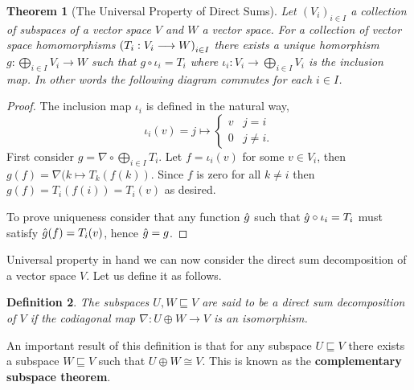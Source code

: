\documentclass[12pt]{extarticle}
\newtheorem{theorem}{Theorem}[section]
\newtheorem{definition}[theorem]{Definition}
\renewcommand{\mapsto}[0]{\longmapsto}
\renewcommand{\to}[0]{\longrightarrow}
\begin{document}
\begin{theorem}[The Universal Property of Direct Sums]
    Let $(V_i)_{i \in I}$ a collection of subspaces of a vector space $V$ and $W$ a vector space. For a collection of vector space homomorphisms $\qty(T_i : V_i \to W)_{i \in I}$ there exists a unique homorphism $g : \bigoplus_{i \in I} V_i \to W$ such that $g \circ \iota_i = T_i$ where $\iota_i : V_i \to \bigoplus_{i \in I} V_i$ is the inclusion map. In other words the following diagram commutes for each $i \in I$.
    

  \begin{center}
  \end{center}
\end{theorem}

\begin{proof}
  The inclusion map $\iota_i$ is defined in the natural way, 
  \[
    \iota_i(v) = j \mapsto \begin{cases}
      v & j = i \\
      0 & j \neq i.
    \end{cases}
  \]
  First consider $g = \nabla \circ \bigoplus_{i \in I} T_i$. Let $f  = \iota_i(v)$ for some $v \in V_i$, then $g(f) = \nabla(k \mapsto T_k(f(k))$. Since $f$ is zero for all $k \neq i$ then $g(f) = T_i(f(i)) = T_i(v)$ as desired.
  
  To prove uniqueness consider that any function $\Hat{g}$ such that $\Hat{g} \circ \iota_i = T_i$ must satisfy $\Hat{g}(f) = T_i(v)$, hence $\Hat{g} = g$. 
\end{proof}

Universal property in hand we can now consider the direct sum decomposition of a vector space $V$. Let us define it as follows. 

\begin{definition}
  The subspaces $U, W \sqsubseteq V$ are said to be a direct sum decomposition of $V$ if the codiagonal map $\nabla: U \oplus W \to V$ is an isomorphism.
\end{definition}

An important result of this definition is that for any subspace $U \sqsubseteq V$ there exists a subspace $W \sqsubseteq V$ such that $U \oplus W \cong V$. This is known as the \textbf{complementary subspace theorem}.
\end{document}
